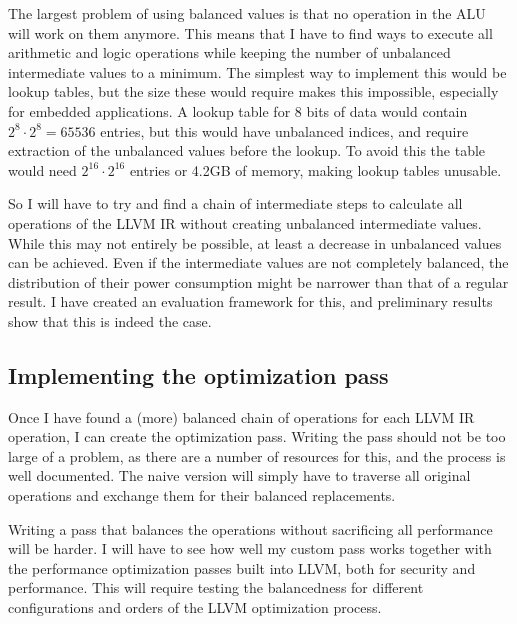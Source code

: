 \documentclass{article}
\newcommand{\llvm}{LLVM}
\begin{document}
The largest problem of using balanced values is that no operation in the ALU will work on them anymore.
This means that I have to find ways to execute all arithmetic and logic operations while keeping the number of unbalanced intermediate values to a minimum.
The simplest way to implement this would be lookup tables, but the size these would require makes this impossible, especially for embedded applications.
A lookup table for 8 bits of data would contain $2^8\cdot2^8=65536$ entries, but this would have unbalanced indices, and require extraction of the unbalanced values before the lookup.
To avoid this the table would need $2^{16}\cdot2^{16}$ entries or 4.2GB of memory, making lookup tables unusable.

So I will have to try and find a chain of intermediate steps to calculate all operations of the \llvm{} IR without creating unbalanced intermediate values.
While this may not entirely be possible, at least a decrease in unbalanced values can be achieved.
Even if the intermediate values are not completely balanced, the distribution of their power consumption might be narrower than that of a regular result.
I have created an evaluation framework for this, and preliminary results show that this is indeed the case.

\subsection{Implementing the optimization pass}
Once I have found a (more) balanced chain of operations for each \llvm{} IR operation, I can create the optimization pass.
Writing the pass should not be too large of a problem, as there are a number of resources for this, and the process is well documented.
The naive version will simply have to traverse all original operations and exchange them for their balanced replacements.

Writing a pass that balances the operations without sacrificing all performance will be harder.
I will have to see how well my custom pass works together with the performance optimization passes built into \llvm{}, both for security and performance.
This will require testing the balancedness for different configurations and orders of the \llvm{} optimization process.
\end{document}
